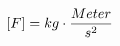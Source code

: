 \documentclass[preview]{standalone}
\begin{document}
\begin{align*}
\special{dvisvgm:raw <g id='unique000'>}[F] = kg \cdot \frac{Meter}{s^{2}}\special{dvisvgm:raw </g>}
\end{align*}
\end{document}
